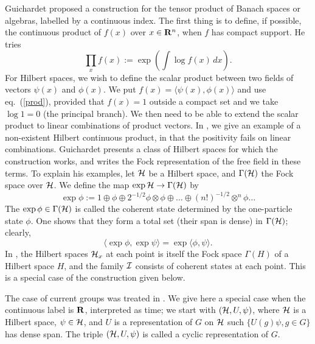 Guichardet \cite{Guichardet} proposed a construction for the
tensor product of Banach spaces or algebras, labelled by a continuous index.
The first thing is to define, if possible, the continuous product of
$f(x)$ over $x\in{\bf R}^n$, when $f$ has compact support. He tries
\begin{equation}
\prod_xf(x):=\exp\left(\int\log f(x)\,dx\right).
\label{prod}
\end{equation}
For Hilbert spaces, we wish to define the scalar product between two
fields of vectors $\psi(x)$ and $\phi(x)$. We put $f(x)=\langle\psi(x),
\phi(x)\rangle$ and use eq.~(\ref{prod}), provided that $f(x)=1$ outside
a compact set and we take $\log 1=0$ (the principal branch).
We then need to be
able to extend the scalar product to linear combinations of product vectors.
In \cite{Dubin}, we
give an example of a non-existent Hilbert continuous product, in that the
positivity fails on linear combinations.
Guichardet presents a class of Hilbert spaces for which the construction
works, and writes the Fock representation of the free field in
these terms. 
To explain his  examples, let ${\cal H}$ be a Hilbert space, and
$\Gamma({\cal H})$ the Fock space over ${\cal H}$. We define the map
$\exp{\cal H}\rightarrow\Gamma({\cal H})$ by
\begin{equation}
\exp\phi:=1\oplus\phi\oplus 2^{-1/2}\phi\otimes\phi\oplus
\ldots\oplus(n!)^{-1/2}\otimes^n\phi\ldots
\label{coherent}
\end{equation}
The $\exp\phi\in\Gamma({\cal H})$ is called the coherent state determined by
the one-particle state $\phi$. One shows that they form a total set (their
span is dense) in $\Gamma({\cal H})$; clearly, 
\begin{equation}
\langle\exp\phi,\exp\psi\rangle=\exp\langle\phi,\psi\rangle.
\label{exp}
\end{equation}
In \cite{Guichardet},
the Hilbert spaces ${\cal H}_x$ at each point is itself the Fock space
$\Gamma(H)$ of a Hilbert space $H$, and the family ${\cal I}$ consists
of coherent states at each point. This is a special case of the construction
given below.

The case of current groups was treated in \cite{RFS2,ArakiW}.
We give here a special case when the continuous label is ${\bf R}$,
interpreted as time; we start with $({\cal H},U,\psi)$, where
${\cal H}$ is a Hilbert space, $\psi\in{\cal H}$, and $U$ is a representation
of $G$ on ${\cal H}$ such $\{U(g)\psi,g\in G\}$ has dense span.
The triple $({\cal H},U,\psi)$ is called a cyclic representation of $G$.


